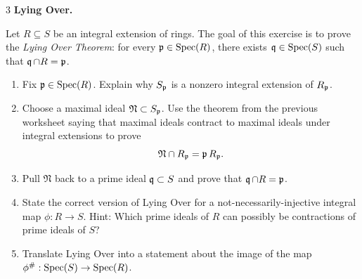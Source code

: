 \documentclass[Notebook.tex]{subfiles}
\begin{document}
\begin{problem}{3}
    \textbf{Lying Over.} 
    
    Let $R\subseteq S$ be an integral extension of rings. The goal of this exercise is to prove the \emph{Lying Over Theorem}: for every $\operatorname{\mathfrak{p}}\in\operatorname{Spec}(R)$, there exists $\operatorname{\mathfrak{q}}\in\operatorname{Spec}(S)$ such that $\operatorname{\mathfrak{q}}\cap R=\operatorname{\mathfrak{p}}$.
    \begin{enumerate}
        \item Fix $\operatorname{\mathfrak{p}}\in\operatorname{Spec}(R)$. Explain why $S_{\operatorname{\mathfrak{p}}}$ is a nonzero integral extension of $R_{\operatorname{\mathfrak{p}}}$.
        \item Choose a maximal ideal $\mathfrak N\subset S_{\operatorname{\mathfrak{p}}}$. Use the theorem from the previous worksheet saying that maximal ideals contract to maximal ideals under integral extensions to prove
        \[
        \mathfrak N\cap R_{\operatorname{\mathfrak{p}}}=\operatorname{\mathfrak{p}} R_{\operatorname{\mathfrak{p}}}.
        \]
        \item Pull $\mathfrak N$ back to a prime ideal $\operatorname{\mathfrak{q}}\subset S$ and prove that $\operatorname{\mathfrak{q}}\cap R=\operatorname{\mathfrak{p}}$.
        \item State the correct version of Lying Over for a not-necessarily-injective integral map $\phi:R\to S$. Hint: Which prime ideals of $R$ can possibly be contractions of prime ideals of $S$?
        \item Translate Lying Over into a statement about the image of the map $\phi^{\#}:\operatorname{Spec}(S)\to\operatorname{Spec}(R)$.
    \end{enumerate}
\end{problem}
\end{document}
